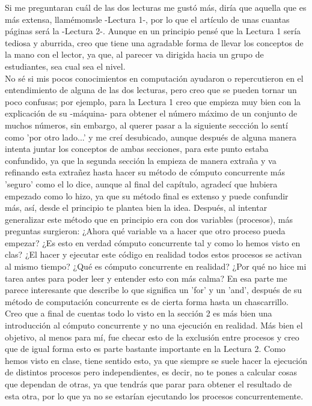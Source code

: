 \documentclass[12pt,a4paper]{article}
\title{\vspace{-2.5cm}\titulo}
\author{\nombre\\\institute\\ \materia\\}
\date{10 de Septiembre de 2019}
\begin{document}
\renewcommand{\sectionmark}[1]{\markboth{#1}{}} 
\maketitle 
Si me preguntaran cuál de las dos lecturas me gustó más, diría que aquella que es más extensa, llamémomsle -Lectura 1-, por lo que el artículo de unas cuantas páginas será la -Lectura 2-. Aunque en un principio pensé que la Lectura 1 sería tediosa y aburrida, creo que tiene una agradable forma de llevar los conceptos de la mano con el lector, ya que, al parecer va dirigida hacia un grupo de estudiantes, sea cual sea el nivel. 
\\

No sé si mis pocos conocimientos en computación ayudaron o repercutieron en el entendimiento de alguna de las dos lecturas, pero creo que se pueden tornar un poco confusas; por ejemplo, para la Lectura 1 creo que empieza muy bien con la explicación de su -máquina- para obtener el número máximo de un conjunto de muchos números, sin embargo, al querer pasar a la siguiente seccción lo sentí como 'por otro lado...' y me creí desubicado, aunque después de alguna manera intenta juntar los conceptos de ambas secciones, para este punto estaba confundido, ya que la segunda sección la empieza de manera extraña y va refinando esta extrañez hasta hacer su método de cómputo concurrente más 'seguro' como el lo dice, aunque al final del capítulo, agradecí que hubiera empezado como lo hizo, ya que su método final es extenso  y puede confundir más, así, desde el principio te plantea bien la idea. Después, al intentar generalizar este método que en principio era con dos variables (procesos), más preguntas surgieron: ¿Ahora qué variable va a hacer que otro proceso pueda empezar? ¿Es esto en verdad cómputo concurrente tal y como lo hemos visto en clas? ¿El hacer y ejecutar este código en realidad todos estos procesos se activan al mismo tiempo? ¿Qué es cómputo concurrente en realidad? ¿Por qué no hice mi tarea antes para poder leer y entender esto con más calma?  En esa parte me parece interesante que describe lo que significa un 'for' y un 'and', después de su método de computación concurrente es de cierta forma hasta un chascarrillo.
\\

Creo que a final de cuentas todo lo visto en la sección 2 es más bien una introducción al cómputo concurrente y no una ejecución en realidad. Más bien el objetivo, al menos para mí, fue checar esto de la exclusión entre procesos y creo que de igual forma esto es parte bastante importante en la Lectura 2. Como hemos visto en clase, tiene sentido esto, ya que siempre se suele hacer la ejecución de distintos procesos pero independientes, es decir, no te pones a calcular cosas que dependan de otras, ya que tendrás que parar para obtener el resultado de esta otra, por lo que ya no se estarían ejecutando los procesos concurrentemente.
\\
\end{document}
